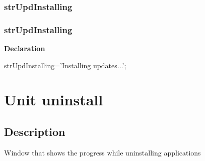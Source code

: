 \documentclass{report}
\newif\ifpdf
\begin{document}
\subsection*{\large{\textbf{strUpdInstalling}}\normalsize\hspace{1ex}\hrulefill}
\else
\subsection*{strUpdInstalling}
\fi
\label{trstrings-strUpdInstalling}
\begin{list}{}{
\setlength{\itemindent}{0cm}
\setlength{\listparindent}{0cm}
\setlength{\leftmargin}{\evensidemargin}
\addtolength{\leftmargin}{\tmplength}
\settowidth{\labelsep}{X}
\addtolength{\leftmargin}{\labelsep}
\setlength{\labelwidth}{\tmplength}
}
\item[\textbf{Declaration}\hfill]
\ifpdf
\begin{flushleft}
\fi
\begin{ttfamily}
strUpdInstalling='Installing updates...';\end{ttfamily}

\ifpdf
\end{flushleft}
\fi

\end{list}
\chapter{Unit uninstall}
\label{uninstall}
\section{Description}
Window that shows the progress while uninstalling applications
\end{document}
